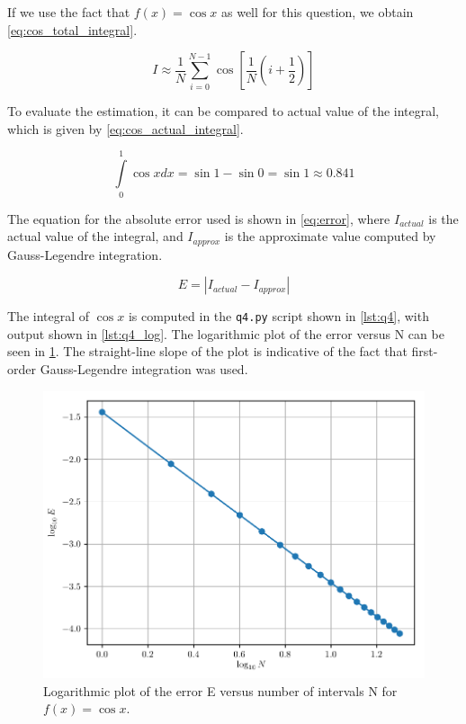 \documentclass[a4paper,titlepage]{article}
\newcommand{\code}[1]{\texttt{#1}}
\begin{document}
	If we use the fact that $f(x) = \cos x$ as well for this question, we obtain \cref{eq:cos_total_integral}.
	
	\begin{equation} \label{eq:cos_total_integral}
		I \approx \frac{1}{N} \sum_{i=0}^{N-1} \cos \left[ \frac{1}{N} \left(i + \frac{1}{2} \right) \right]
	\end{equation}
	
	To evaluate the estimation, it can be compared to actual value of the integral, which is given by \cref{eq:cos_actual_integral}.
	
	\begin{equation} \label{eq:cos_actual_integral}
		\int\limits_{0}^{1} \cos x dx = \sin 1 - \sin 0 = \sin 1 \approx 0.841
	\end{equation}
	
	The equation for the absolute error used is shown in \cref{eq:error}, where $I_{actual}$ is the actual value of the integral, and $I_{approx}$ is the approximate value computed by Gauss-Legendre integration.
	
	\begin{equation} \label{eq:error}
		E = | I_{actual}  - I_{approx}|
	\end{equation}
	
 	The integral of $\cos x$ is computed in the \code{q4.py} script shown in \cref{lst:q4}, with output shown in \cref{lst:q4_log}. The logarithmic plot of the error versus N can be seen in \cref{fig:q4a}. The straight-line slope of the plot is indicative of the fact that first-order Gauss-Legendre integration was used.
	
	\begin{figure}[!htb]
		\centering
		\includegraphics[width=\columnwidth]{plots/q4a.pdf}
		\caption
		{Logarithmic plot of the error E versus number of intervals N for $f(x) = \cos x$.}
		\label{fig:q4a}
	\end{figure}
	
\end{document}
